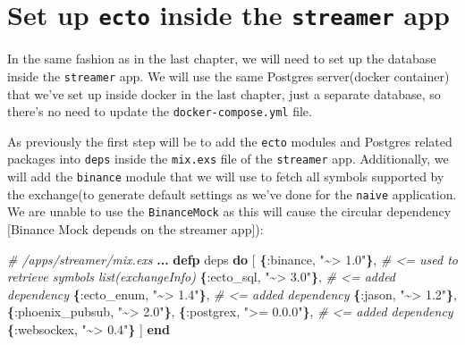 \documentclass[
  oneside]{book}
\newenvironment{Shaded}{\begin{snugshade}}{\end{snugshade}}
\newcommand{\CommentTok}[1]{\textcolor[rgb]{0.56,0.35,0.01}{\textit{#1}}}
\newcommand{\FunctionTok}[1]{\textcolor[rgb]{0.13,0.29,0.53}{\textbf{#1}}}
\newcommand{\KeywordTok}[1]{\textcolor[rgb]{0.13,0.29,0.53}{\textbf{#1}}}
\newcommand{\NormalTok}[1]{#1}
\newcommand{\OperatorTok}[1]{\textcolor[rgb]{0.81,0.36,0.00}{\textbf{#1}}}
\newcommand{\OtherTok}[1]{\textcolor[rgb]{0.56,0.35,0.01}{#1}}
\newcommand{\StringTok}[1]{\textcolor[rgb]{0.31,0.60,0.02}{#1}}
\newcommand{\VariableTok}[1]{\textcolor[rgb]{0.00,0.00,0.00}{#1}}
\begin{document}
\section{\texorpdfstring{Set up \texttt{ecto} inside the \texttt{streamer} app}{Set up ecto inside the streamer app}}\label{set-up-ecto-inside-the-streamer-app}

In the same fashion as in the last chapter, we will need to set up the database inside the \texttt{streamer} app. We will use the same Postgres server(docker container) that we've set up inside docker in the last chapter, just a separate database, so there's no need to update the \texttt{docker-compose.yml} file.

As previously the first step will be to add the \texttt{ecto} modules and Postgres related packages into \texttt{deps} inside the \texttt{mix.exs} file of the \texttt{streamer} app. Additionally, we will add the \texttt{binance} module that we will use to fetch all symbols supported by the exchange(to generate default settings as we've done for the \texttt{naive} application. We are unable to use the \texttt{BinanceMock} as this will cause the circular dependency {[}Binance Mock depends on the streamer app{]}):

\begin{Shaded}
\begin{Highlighting}[]
  \CommentTok{\# /apps/streamer/mix.exs}
  \OperatorTok{...}
  \KeywordTok{defp}\NormalTok{ deps }\KeywordTok{do}
    \OtherTok{[}
      \FunctionTok{\{}\VariableTok{:binance}\NormalTok{, }\StringTok{"\textasciitilde{}\textgreater{} 1.0"}\FunctionTok{\}}\NormalTok{,    }\CommentTok{\# \textless{}= used to retrieve symbols list(exchangeInfo)}
      \FunctionTok{\{}\VariableTok{:ecto\_sql}\NormalTok{, }\StringTok{"\textasciitilde{}\textgreater{} 3.0"}\FunctionTok{\}}\NormalTok{,   }\CommentTok{\# \textless{}= added dependency}
      \FunctionTok{\{}\VariableTok{:ecto\_enum}\NormalTok{, }\StringTok{"\textasciitilde{}\textgreater{} 1.4"}\FunctionTok{\}}\NormalTok{,  }\CommentTok{\# \textless{}= added dependency}
      \FunctionTok{\{}\VariableTok{:jason}\NormalTok{, }\StringTok{"\textasciitilde{}\textgreater{} 1.2"}\FunctionTok{\}}\NormalTok{,}
      \FunctionTok{\{}\VariableTok{:phoenix\_pubsub}\NormalTok{, }\StringTok{"\textasciitilde{}\textgreater{} 2.0"}\FunctionTok{\}}\NormalTok{,}
      \FunctionTok{\{}\VariableTok{:postgrex}\NormalTok{, }\StringTok{"\textgreater{}= 0.0.0"}\FunctionTok{\}}\NormalTok{, }\CommentTok{\# \textless{}= added dependency}
      \FunctionTok{\{}\VariableTok{:websockex}\NormalTok{, }\StringTok{"\textasciitilde{}\textgreater{} 0.4"}\FunctionTok{\}}
    \OtherTok{]}
  \KeywordTok{end}
\end{Highlighting}
\end{Shaded}
\end{document}
